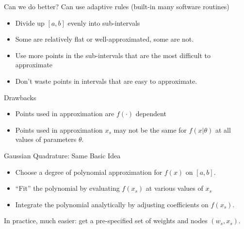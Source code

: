 \documentclass[aspectratio=169,11pt]{beamer}
\begin{document}
\begin{frame}{Can we do better?}
Can use \alert{adaptive rules} (built-in many software routines)
\begin{itemize}
\item Divide up $[a,b]$ evenly into sub-intervals
\item Some are relatively flat or well-approximated, some are not.
\item Use more points in the sub-intervals that are the most difficult to approximate
\item Don't waste points in intervals that are easy to approximate.
\end{itemize}
Drawbacks
\begin{itemize}
\item Points used in approximation are $f(\cdot)$ dependent
\item Points used in approximation $x_s$ may not be the same for $f(x | \theta)$ at all values of parameters $\theta$.
\end{itemize}
\end{frame}



\begin{frame}{Gaussian Quadrature: Same Basic Idea}
\begin{itemize}
\item Choose a degree of polynomial approximation for $f(x)$ on $[a,b]$.
\item ``Fit'' the polynomial by evaluating $f(x_s)$ at various values of $x_s$
\item Integrate the polynomial analytically by adjusting coefficients on $f(x_s)$.
\end{itemize}
In practice, much easier: get a pre-specified set of weights and nodes $(w_s,x_s)$.
\end{frame}
\end{document}
